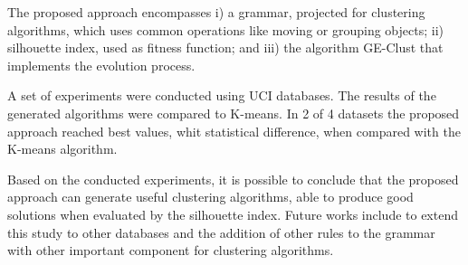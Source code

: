 \documentclass[conference]{IEEEtran}
\begin{document}
	The proposed approach encompasses i) a grammar,  projected for clustering algorithms, which uses common operations like moving or grouping objects; ii)  silhouette index, used as fitness function; and iii) the algorithm GE-Clust that implements the evolution process. 
	
	A set of experiments were conducted using UCI databases. The results of the generated algorithms were compared to K-means. In 2 of 4 datasets the proposed approach reached best values, whit statistical difference, when compared with the K-means algorithm.
	
	Based on the conducted experiments, it is possible to conclude that the proposed approach can generate useful clustering algorithms, able to produce good solutions when evaluated by the silhouette index. Future works include to extend this study to other databases and the addition of other rules to the grammar with other important component for clustering algorithms.
	
	
	
	
	
\end{document}
